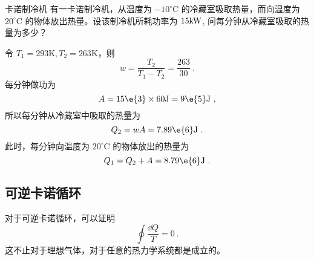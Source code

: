 \begin{example}{卡诺制冷机}
有一卡诺制冷机，从温度为 $-10^{\circ} \mathrm{C}$ 的冷藏室吸取热量，而向温度为 $20^{\circ} \mathrm{C}$ 的物体放出热量。设该制冷机所耗功率为 $15\rm kW$, 问每分钟从冷藏室吸取的热量为多少？

令 $T_1 = 293 \mathrm K , T_2 = 263 \mathrm K $，则
\begin{equation}
w=\frac{T_{2}}{T_{1}-T_{2}}=\frac{263}{30}~.
\end{equation}
每分钟做功为
\begin{equation}
A=15\e{3} \times 60 \mathrm{J}=9\e{5} \mathrm{J}~,
\end{equation}
所以每分钟从冷藏室中吸取的热量为
\begin{equation}
Q_{2}=w A=7.89\e{6} \mathrm{J}~.
\end{equation}
此时，每分钟向温度为 $20^{\circ} \mathrm{C}$ 的物体放出的热量为
\begin{equation}
Q_{1}=Q_{2}+A=8.79\e{6} \mathrm{J}~.
\end{equation}

\end{example}
\subsection{可逆卡诺循环}
对于可逆卡诺循环，可以证明
\begin{equation}
\oint \frac{\dd Q}{T}=0~.
\end{equation}
这不止对于理想气体，对于任意的热力学系统都是成立的。
